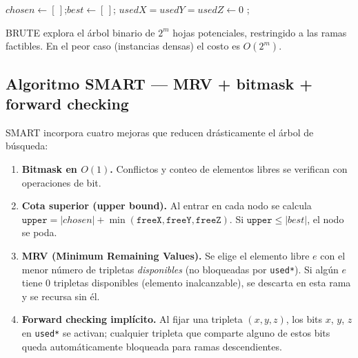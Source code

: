 \begin{algorithm}[htbp]
\DontPrintSemicolon
\caption{BRUTE: backtracking sobre las $m$ tripletas}
\label{alg:brute}
$chosen \leftarrow [\,]$;\quad $best \leftarrow [\,]$;\quad
$usedX = usedY = usedZ \leftarrow 0$\;
;\quad {}
\end{algorithm}

BRUTE explora el árbol binario de $2^m$ hojas potenciales, restringido a las
ramas factibles.  En el peor caso (instancias densas) el costo es $O(2^m)$.

\subsection{Algoritmo SMART --- MRV + bitmask + forward checking}
\label{sec:impl:smart}

SMART incorpora cuatro mejoras que reducen drásticamente el árbol de búsqueda:

\begin{enumerate}
  \item \textbf{Bitmask en $O(1)$.}  Conflictos y conteo de elementos libres
        se verifican con operaciones de bit.
  \item \textbf{Cota superior (upper bound).}  Al entrar en cada nodo se
        calcula
        $\texttt{upper} = |chosen| + \min(\texttt{freeX}, \texttt{freeY},
        \texttt{freeZ})$.
        Si $\texttt{upper}\le|best|$, el nodo se poda.
  \item \textbf{MRV (Minimum Remaining Values).}  Se elige el elemento libre
        $e$ con el menor número de tripletas \emph{disponibles} (no
        bloqueadas por \texttt{used*}).
        Si algún $e$ tiene 0 tripletas disponibles (elemento inalcanzable),
        se descarta en esta rama y se recursa sin él.
  \item \textbf{Forward checking implícito.}  Al fijar una tripleta
        $(x,y,z)$, los bits $x$, $y$, $z$ en \texttt{used*} se activan;
        cualquier tripleta que comparte alguno de estos bits queda
        automáticamente bloqueada para ramas descendientes.
\end{enumerate}

